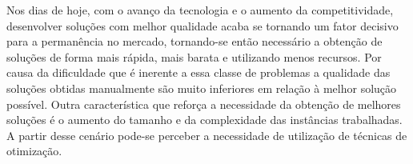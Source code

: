  
  
Nos dias de hoje, com o avanço da tecnologia e o aumento da competitividade,
desenvolver soluções com melhor qualidade acaba se tornando um fator decisivo
para a permanência no mercado, tornando-se então necessário a obtenção de
soluções de forma mais rápida, mais barata e utilizando menos recursos. Por
causa da dificuldade que é inerente a essa classe de problemas a qualidade das
soluções obtidas manualmente são muito inferiores em relação à melhor solução
possível. Outra característica que reforça a necessidade da obtenção de melhores soluções é o
aumento do tamanho e da complexidade das instâncias trabalhadas. A partir desse
cenário pode-se perceber a necessidade de utilização de técnicas de otimização.

  



